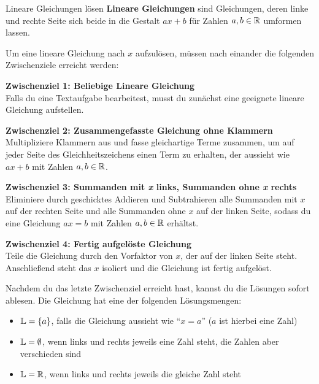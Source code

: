 \documentclass[../../main.tex]{subfiles}
\begin{document}
\begin{nutshell}{Lineare Gleichungen lösen}
    \textbf{Lineare Gleichungen} sind Gleichungen, deren linke und rechte Seite sich beide in die Gestalt $ax+b$ für Zahlen $a,b\in\mathbb{R}$ umformen lassen. 
    
    Um eine lineare Gleichung nach $x$ aufzulösen, müssen nach einander die folgenden Zwischenziele erreicht werden:
    \vspace*{2mm}
    
    \textbf{Zwischenziel 1: Beliebige Lineare Gleichung}\\ 
    Falls du eine Textaufgabe bearbeitest, musst du zunächst eine geeignete lineare Gleichung aufstellen.
    \vspace*{2mm}
    
    \textbf{Zwischenziel 2: Zusammengefasste Gleichung ohne Klammern}\\
    Multipliziere Klammern aus und fasse gleichartige Terme zusammen, um auf jeder Seite des Gleichheitszeichens einen Term zu erhalten, der aussieht wie $ax+b$ mit Zahlen $a,b\in\mathbb{R}$.
    \vspace*{2mm}
    
    \textbf{Zwischenziel 3: Summanden mit \emph{x} links, Summanden ohne \emph{x} rechts}\\
    Eliminiere durch geschicktes Addieren und Subtrahieren alle Summanden mit $x$ auf der rechten Seite und alle Summanden ohne $x$ auf der linken Seite, sodass du eine Gleichung $ax=b$ mit Zahlen $a,b\in\mathbb{R}$ erhältst.
    \vspace*{2mm}
    
    \textbf{Zwischenziel 4: Fertig aufgelöste Gleichung}\\
    Teile die Gleichung durch den Vorfaktor von $x$, der auf der linken Seite steht. Anschließend steht das $x$ isoliert und die Gleichung ist fertig aufgelöst.
    \vspace*{4mm}
    
    Nachdem du das letzte Zwischenziel erreicht hast, kannst du die Lösungen sofort ablesen. Die Gleichung hat eine der folgenden Lösungsmengen:
    \begin{itemize}
        \item $\mathbb{L}=\{a\}$, falls die Gleichung aussieht wie \enquote{$x=a$} ($a$ ist hierbei eine Zahl)
        \item $\mathbb{L}=\emptyset$, wenn links und rechts jeweils eine Zahl steht, die Zahlen aber verschieden sind
        \item $\mathbb{L}=\mathbb{R}$, wenn links und rechts jeweils die gleiche Zahl steht
    \end{itemize}
\end{nutshell}
\end{document}
